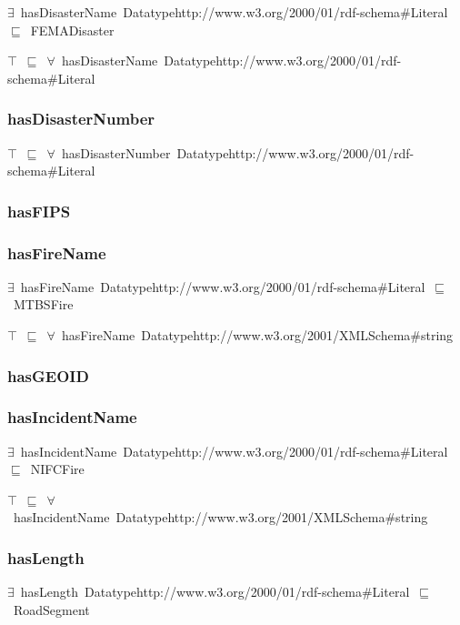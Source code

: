 \documentclass{article}
\begin{document}
\ensuremath{\exists}~hasDisasterName~Datatypehttp://www.w3.org/2000/01/rdf-schema#Literal~\ensuremath{\sqsubseteq}~FEMADisaster

\ensuremath{\top}~\ensuremath{\sqsubseteq}~\ensuremath{\forall}~hasDisasterName~Datatypehttp://www.w3.org/2000/01/rdf-schema#Literal

\subsubsection*{hasDisasterNumber}

\ensuremath{\top}~\ensuremath{\sqsubseteq}~\ensuremath{\forall}~hasDisasterNumber~Datatypehttp://www.w3.org/2000/01/rdf-schema#Literal

\subsubsection*{hasFIPS}

\subsubsection*{hasFireName}

\ensuremath{\exists}~hasFireName~Datatypehttp://www.w3.org/2000/01/rdf-schema#Literal~\ensuremath{\sqsubseteq}~MTBSFire

\ensuremath{\top}~\ensuremath{\sqsubseteq}~\ensuremath{\forall}~hasFireName~Datatypehttp://www.w3.org/2001/XMLSchema#string

\subsubsection*{hasGEOID}

\subsubsection*{hasIncidentName}

\ensuremath{\exists}~hasIncidentName~Datatypehttp://www.w3.org/2000/01/rdf-schema#Literal~\ensuremath{\sqsubseteq}~NIFCFire

\ensuremath{\top}~\ensuremath{\sqsubseteq}~\ensuremath{\forall}~hasIncidentName~Datatypehttp://www.w3.org/2001/XMLSchema#string

\subsubsection*{hasLength}

\ensuremath{\exists}~hasLength~Datatypehttp://www.w3.org/2000/01/rdf-schema#Literal~\ensuremath{\sqsubseteq}~RoadSegment
\end{document}
